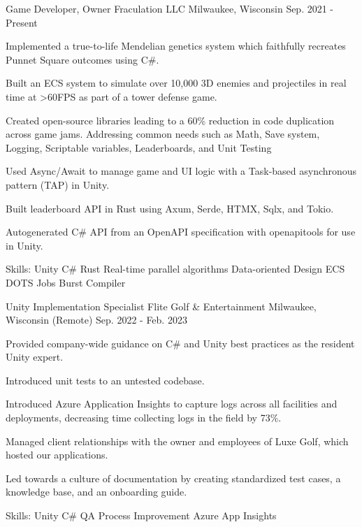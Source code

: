\begin{cventries}
  \cventry
    {Game Developer, Owner} %
    {Fraculation LLC} %
    {Milwaukee, Wisconsin} %
    {Sep. 2021 - Present} %
    {
      \begin{cvitems} %
        \item {Implemented a true-to-life Mendelian genetics system which faithfully recreates Punnet Square outcomes using C\#.}
        \item {Built an ECS system to simulate over 10,000 3D enemies and projectiles in real time at >60FPS as part of a tower defense game.}
        \item {Created open-source libraries leading to a 60\% reduction in code duplication across game jams. Addressing common needs such as Math, Save system, Logging, Scriptable variables, Leaderboards, and Unit Testing}
        \item {Used Async/Await to manage game and UI logic with a Task-based asynchronous pattern (TAP) in Unity.}
        \item {Built leaderboard API in Rust using Axum, Serde, HTMX, Sqlx, and Tokio.}
        \item {Autogenerated C\# API from an OpenAPI specification with openapitools for use in Unity.}
        \item {Skills: Unity \textbullet{} C\# \textbullet{} Rust \textbullet{} Real-time parallel algorithms \textbullet{} Data-oriented Design \textbullet{} ECS \textbullet{} DOTS \textbullet{} Jobs \textbullet{} Burst Compiler}
      \end{cvitems}
    }

  \cventry
    {Unity Implementation Specialist} %
    {Flite Golf \& Entertainment} %
    {Milwaukee, Wisconsin (Remote)} %
    {Sep. 2022 - Feb. 2023} %
    {
      \begin{cvitems} %
        \item {Provided company-wide guidance on C\# and Unity best practices as the resident Unity expert.}
        \item {Introduced unit tests to an untested codebase.}
        \item {Introduced Azure Application Insights to capture logs across all facilities and deployments, decreasing time collecting logs in the field by 73\%.}
        \item {Managed client relationships with the owner and employees of Luxe Golf, which hosted our applications.}
        \item {Led towards a culture of documentation by creating standardized test cases, a knowledge base, and an onboarding guide.}
        \item {Skills: Unity \textbullet{} C\# \textbullet{} QA Process Improvement \textbullet{} Azure App Insights}
      \end{cvitems}
    }


\end{cventries}
